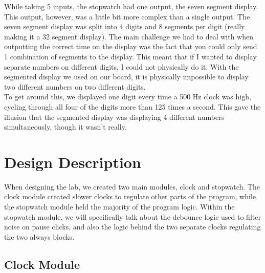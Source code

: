 \documentclass{article}
\begin{document}
While taking 5 inputs, the stopwatch had one output, the seven segment display.  This output, however, was a little bit more complex than a single output.  The seven segment display was split into 4 digits and 8 segments per digit (really making it a 32 segment display).  The main challenge we had to deal with when outputting the correct time on the display was the fact that you could only send 1 combination of segments to the display. This meant that if I wanted to display separate numbers on different digits, I could not physically do it.  With the segmented display we used on our board, it is physically impossible to display two different numbers on two different digits.\\ 
To get around this, we displayed one digit every time a 500 Hz clock was high, cycling through all four of the digits more than 125 times a second.  This gave the illusion that the segmented display was displaying 4 different numbers simultaneously, though it wasn't really.

 

\section*{Design Description}



When designing the lab, we created two main modules, clock and stopwatch.  The clock module created slower clocks to regulate other parts of the program, while the stopwatch module held the majority of the program logic. Within the stopwatch module, we will specifically talk about the debounce logic used to filter noise on pause clicks, and also the logic behind the two separate clocks regulating the two always blocks.

\subsection*{Clock Module}
\end{document}
